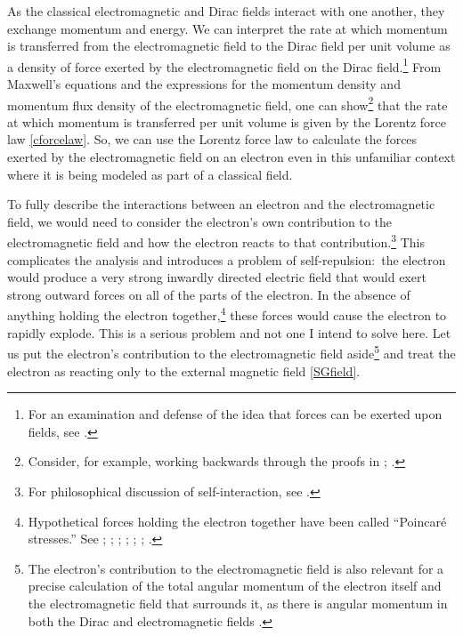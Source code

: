 \documentclass[onecolumn,secnumarabic,amsmath,amssymb,balancelastpage,nofootinbib]{article}
\begin{document}
As the classical electromagnetic and Dirac fields interact with one another, they exchange momentum and energy.  We can interpret the rate at which momentum is transferred from the electromagnetic field to the Dirac field per unit volume as a density of force exerted by the electromagnetic field on the Dirac field.\footnote{For an examination and defense of the idea that forces can be exerted upon fields, see \citet{forcesonfields}.}  From Maxwell's equations and the expressions for the momentum density and momentum flux density of the electromagnetic field, one can show\footnote{Consider, for example, working backwards through the proofs in \citet[sec.\ 6.7]{jackson}; \citet[sec.\ 8.2]{griffiths}.} that the rate at which momentum is transferred per unit volume is given by the Lorentz force law \eqref{cforcelaw}.  So, we can use the Lorentz force law to calculate the forces exerted by the electromagnetic field on an electron even in this unfamiliar context where it is being modeled as part of a classical field.

To fully describe the interactions between an electron and the electromagnetic field, we would need to consider the electron's own contribution to the electromagnetic field and how the electron reacts to that contribution.\footnote{For philosophical discussion of self-interaction, see \citet{lange, frisch2005, earman2011, lazarovici2018, maudlin2018, hartensteinhubert}.}  This complicates the analysis and introduces a problem of self-repulsion:\ the electron would produce a very strong inwardly directed electric field that would exert strong outward forces on all of the parts of the electron.  In the absence of anything holding the electron together,\footnote{Hypothetical forces holding the electron together have been called ``Poincar\'{e} stresses.''  See \citet[ch.\ 28]{feynman2}; \citet{rohrlich1973}; \citet{pearle1982}; \citet{schwinger1983electromagnetic}; \citet[ch.\ 16]{jackson}; \citet[sec.\ 6.3]{rohrlich}; \citet[sec.\ 5]{griffithsletter}.} these forces would cause the electron to rapidly explode.  This is a serious problem and not one I intend to solve here.  Let us put the electron's contribution to the electromagnetic field aside\footnote{The electron's contribution to the electromagnetic field is also relevant for a precise calculation of the total angular momentum of the electron itself and the electromagnetic field that surrounds it, as there is angular momentum in both the Dirac and electromagnetic fields \citep{howelectronsspin}.} and treat the electron as reacting only to the external magnetic field \eqref{SGfield}.
\end{document}
